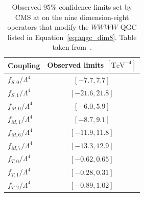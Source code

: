 \begin{table}[htbp]
  \centering
  \begin{tabular}{l c}
    Coupling & Observed limits $[\textrm{TeV}^{-4}]$ \\
    \hline\hline
    $f_{S,0}/\Lambda^4$ & $[-7.7, 7.7]$ \\
    $f_{S,1}/\Lambda^4$ & $[-21.6, 21.8]$ \\
    $f_{M,0}/\Lambda^4$ & $[-6.0, 5.9]$ \\
    $f_{M,1}/\Lambda^4$ & $[-8.7, 9.1]$ \\
    $f_{M,6}/\Lambda^4$ & $[-11.9, 11.8]$ \\
    $f_{M,7}/\Lambda^4$ & $[-13.3, 12.9]$ \\
    $f_{T,0}/\Lambda^4$ & $[-0.62, 0.65]$ \\
    $f_{T,1}/\Lambda^4$ & $[-0.28, 0.31]$ \\
    $f_{T,2}/\Lambda^4$ & $[-0.89, 1.02]$ \\
    \hline
  \end{tabular}
  \caption[Observed 95\% confidence limits set by CMS at  on the nine dimension-eight operators that modify the $WWWW$ QGC listed in Equation~\ref{eq:aqgc_dim8}.]{Observed 95\% confidence limits set by CMS at  on the nine dimension-eight operators that modify the $WWWW$ QGC listed in Equation~\ref{eq:aqgc_dim8}. Table taken from~\cite{2017.ssww-13tev-cms}.}
  \label{tab:aqgc_cms}
\end{table}

